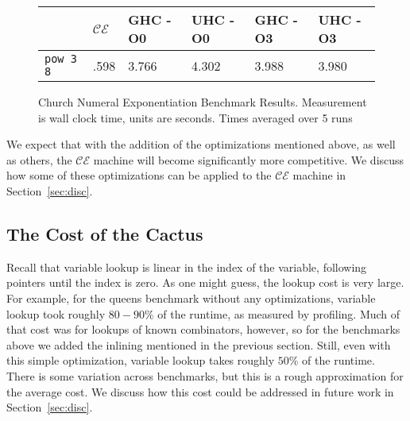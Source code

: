 \begin{figure*}
\begin{tabularx}{\textwidth}{l | X | X | X | X | X}
& $\mathcal{CE}$ & GHC -O0 & UHC -O0 & GHC -O3 & UHC -O3 \\
\hline
\texttt{pow 3 8} & .598 & 3.766 & 4.302 & 3.988 & 3.980 \\
\end{tabularx}
\caption{Church Numeral Exponentiation Benchmark Results. Measurement is wall clock time, 
units are seconds. Times averaged over 5 runs}
\label{fig:res-church}
\end{figure*}

We expect that with the addition of the optimizations mentioned above, as well
as others, the $\mathcal{CE}$ machine will become significantly more
competitive. We discuss how some of these optimizations can be applied to the
$\mathcal{CE}$ machine in Section~\ref{sec:disc}.

\subsection{The Cost of the Cactus}

Recall that variable lookup is linear in the index of the variable, following
pointers until the index is zero. As one might guess, the lookup cost is very
large. For example, for the queens benchmark without any optimizations, variable
lookup took roughly $80-90\%$ of the runtime, as measured by profiling. Much of
that cost was for lookups of known combinators, however, so for the benchmarks
above we added the inlining mentioned in the previous section. Still, even with
this simple optimization, variable lookup takes roughly $50\%$ of the
runtime. There is some variation across benchmarks, but this is a rough
approximation for the average cost. We discuss how this cost could be addressed
in future work in Section~\ref{sec:disc}.


